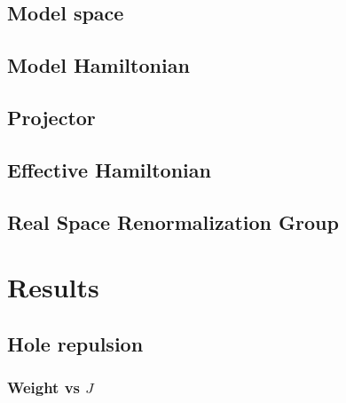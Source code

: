 \documentclass[ openright,titlepage,numbers=noenddot,headinclude,twoside,%
                footinclude=true,cleardoublepage=empty,abstractoff,%
                BCOR=5mm,paper=a4,fontsize=11pt,%
                ngerman,american,%
]{scrreprt}
\begin{document}
\section{Model space}

\section{Model Hamiltonian}

\section{Projector}

\section{Effective Hamiltonian}

\section{Real Space Renormalization Group}

\chapter{Results}

\section{Hole repulsion}


\subsection{Weight vs $J$}
\end{document}
